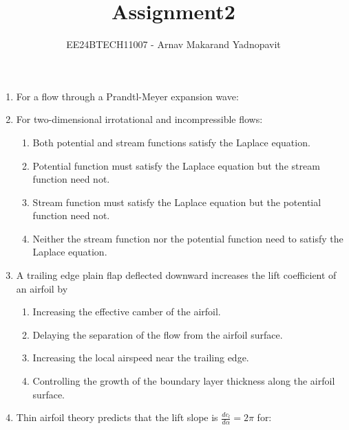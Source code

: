 \documentclass[journal,12pt,onecolumn]{IEEEtran}
\theoremstyle{remark}
\begin{document}
\title{Assignment2}
\author{EE24BTECH11007 - Arnav Makarand Yadnopavit}
\maketitle
\renewcommand{\thefigure}{\theenumi}
\renewcommand{\thetable}{\theenumi}
\begin{enumerate}
\item For a flow through a Prandtl-Meyer expansion wave:
\begin{enumerate}
\end{enumerate}
\item For two-dimensional irrotational and incompressible flows:
\begin{enumerate}
\item Both potential and stream functions satisfy the Laplace equation.
\item Potential function must satisfy the Laplace equation but the stream function need not.
\item Stream function must satisfy the Laplace equation but the potential function need not.
\item Neither the stream function nor the potential function need to satisfy the Laplace equation.
\end{enumerate}
\item A trailing edge plain flap deflected downward increases the lift coefficient of an airfoil by
\begin{enumerate}
\item Increasing the effective camber of the airfoil.
\item Delaying the separation of the flow from the airfoil surface.
\item Increasing the local airspeed near the trailing edge.
\item Controlling the growth of the boundary layer thickness along the airfoil surface.
\end{enumerate}
\item Thin airfoil theory predicts that the lift slope is $\frac{dc_l}{d\alpha}=2\pi$ for:
\begin{enumerate}
\begin{multicols}{2}

\end{multicols}
\end{enumerate}
\end{enumerate}
\end{document}
